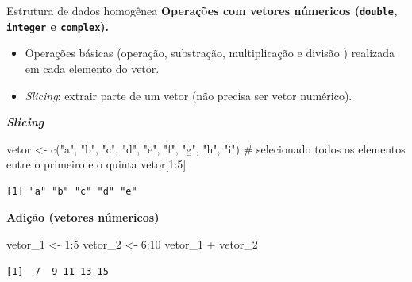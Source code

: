 \documentclass[
  10pt,
  ignorenonframetext,
]{beamer}
\newenvironment{Shaded}{\begin{snugshade}}{\end{snugshade}}
\newcommand{\CommentTok}[1]{\textcolor[rgb]{0.37,0.37,0.37}{#1}}
\newcommand{\DecValTok}[1]{\textcolor[rgb]{0.68,0.00,0.00}{#1}}
\newcommand{\FunctionTok}[1]{\textcolor[rgb]{0.28,0.35,0.67}{#1}}
\newcommand{\NormalTok}[1]{\textcolor[rgb]{0.00,0.23,0.31}{#1}}
\newcommand{\OtherTok}[1]{\textcolor[rgb]{0.00,0.23,0.31}{#1}}
\newcommand{\SpecialCharTok}[1]{\textcolor[rgb]{0.37,0.37,0.37}{#1}}
\newcommand{\StringTok}[1]{\textcolor[rgb]{0.13,0.47,0.30}{#1}}
\providecommand{\tightlist}{%
  \setlength{\itemsep}{0pt}\setlength{\parskip}{0pt}}\usepackage{longtable,booktabs,array}
\begin{document}
\begin{frame}[fragile]{Estrutura de dados homogênea}
\protect\hypertarget{estrutura-de-dados-homoguxeanea-4}{}
\textbf{Operações com vetores númericos (\texttt{double},
\texttt{integer} e \texttt{complex}).}

\begin{itemize}
\tightlist
\item
  Operações básicas (operação, substração, multiplicação e divisão )
  realizada em cada elemento do vetor.
\item
  \emph{Slicing}: extrair parte de um vetor (não precisa ser vetor
  numérico).
\end{itemize}

\textbf{\emph{Slicing}}

\begin{Shaded}
\begin{Highlighting}[]
\NormalTok{vetor }\OtherTok{\textless{}{-}} \FunctionTok{c}\NormalTok{(}\StringTok{"a"}\NormalTok{, }\StringTok{"b"}\NormalTok{, }\StringTok{"c"}\NormalTok{, }\StringTok{"d"}\NormalTok{, }\StringTok{"e"}\NormalTok{, }\StringTok{"f"}\NormalTok{, }\StringTok{"g"}\NormalTok{, }\StringTok{"h"}\NormalTok{, }\StringTok{"i"}\NormalTok{)}
\CommentTok{\# selecionado todos os elementos entre o primeiro e o quinta}
\NormalTok{vetor[}\DecValTok{1}\SpecialCharTok{:}\DecValTok{5}\NormalTok{] }
\end{Highlighting}
\end{Shaded}

\begin{verbatim}
[1] "a" "b" "c" "d" "e"
\end{verbatim}

\textbf{Adição (vetores númericos)}

\begin{Shaded}
\begin{Highlighting}[]
\NormalTok{vetor\_1 }\OtherTok{\textless{}{-}} \DecValTok{1}\SpecialCharTok{:}\DecValTok{5}
\NormalTok{vetor\_2 }\OtherTok{\textless{}{-}} \DecValTok{6}\SpecialCharTok{:}\DecValTok{10}
\NormalTok{vetor\_1 }\SpecialCharTok{+}\NormalTok{ vetor\_2}
\end{Highlighting}
\end{Shaded}

\begin{verbatim}
[1]  7  9 11 13 15
\end{verbatim}
\end{frame}
\end{document}
